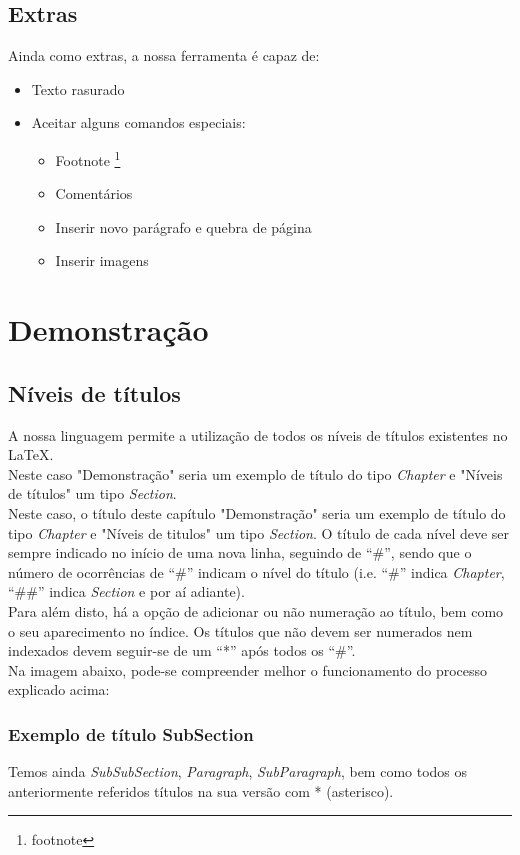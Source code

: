 \documentclass{report}
\begin{document}
\section{ Extras
}
Ainda como extras, a nossa ferramenta é capaz de:
\begin{itemize}
\item  Texto rasurado
\item  Aceitar alguns comandos especiais:
    \begin{itemize}
\item  Footnote \footnote{{footnote}}
    \item  Comentários %
    \item  Inserir novo parágrafo e quebra de página
    \item  Inserir imagens
    \end{itemize}
\end{itemize}


\chapter{Demonstração
}

\section{Níveis de títulos
}
A nossa linguagem permite a utilização de todos os 
níveis de títulos existentes no \LaTeX. 
\\
Neste caso "Demonstração" seria um exemplo de título do tipo \textit{Chapter} 
e "Níveis de títulos" um tipo \textit{Section}. 
\\
Neste caso, o título deste capítulo "Demonstração" seria um exemplo 
de título do tipo \textit{Chapter} e "Níveis de titulos" um tipo \textit{Section}. 
O título de cada nível deve ser sempre indicado no início de uma nova linha, 
seguindo de “\#”, sendo que o número de ocorrências de “\#” indicam o nível do 
título (i.e. “\#” indica \textit{Chapter}, “\#\#” indica \textit{Section} e por aí adiante).
\\
Para além disto, há a opção de adicionar ou não numeração ao título, 
bem como o seu aparecimento no índice. Os títulos que não devem ser numerados 
nem indexados devem seguir-se de um “*” após todos os “\#”.
\\
Na imagem abaixo, pode-se compreender melhor o funcionamento 
do processo explicado acima:

\subsection{Exemplo de título SubSection
}
Temos ainda \textit{SubSubSection}, \textit{Paragraph}, \textit{SubParagraph}, 
bem como todos os anteriormente referidos títulos na sua versão 
com * (asterisco).
\end{document}
